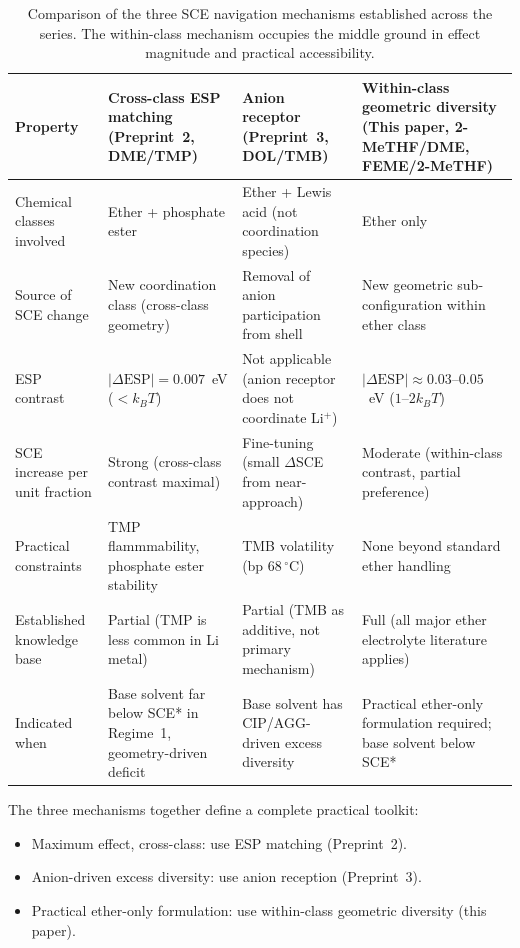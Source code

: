 \documentclass[11pt]{article}
\theoremstyle{plain}
\theoremstyle{definition}
\theoremstyle{remark}
\begin{document}
\begin{table}[h!]
\centering
\caption{Comparison of the three SCE navigation mechanisms established
across the series.  The within-class mechanism occupies the middle
ground in effect magnitude and practical accessibility.}
\label{tab:mechanism_comparison}
\small
\begin{tabular}{p{2.8cm}p{3.3cm}p{3.3cm}p{3.3cm}}
\toprule
Property & Cross-class ESP matching
  (Preprint~2, DME/TMP)
  & Anion receptor
  (Preprint~3, DOL/TMB)
  & Within-class geometric diversity
  (This paper, 2-MeTHF/DME, FEME/2-MeTHF) \\
\midrule
Chemical classes involved &
  Ether + phosphate ester &
  Ether + Lewis acid (not coordination species) &
  Ether only \\[4pt]
Source of SCE change &
  New coordination class (cross-class geometry) &
  Removal of anion participation from shell &
  New geometric sub-configuration within ether class \\[4pt]
ESP contrast &
  $|\Delta\mathrm{ESP}| = 0.007$~eV ($<k_BT$) &
  Not applicable (anion receptor does not coordinate Li$^+$) &
  $|\Delta\mathrm{ESP}| \approx 0.03$--$0.05$~eV ($1$--$2k_BT$) \\[4pt]
SCE increase per unit fraction &
  Strong (cross-class contrast maximal) &
  Fine-tuning (small $\Delta$SCE from near-approach) &
  Moderate (within-class contrast, partial preference) \\[4pt]
Practical constraints &
  TMP flammmability, phosphate ester stability &
  TMB volatility (bp $68\,^\circ$C) &
  None beyond standard ether handling \\[4pt]
Established knowledge base &
  Partial (TMP is less common in Li metal) &
  Partial (TMB as additive, not primary mechanism) &
  Full (all major ether electrolyte literature applies) \\[4pt]
Indicated when &
  Base solvent far below SCE* in Regime~1, geometry-driven deficit &
  Base solvent has CIP/AGG-driven excess diversity &
  Practical ether-only formulation required; base solvent below SCE* \\
\bottomrule
\end{tabular}
\end{table}

The three mechanisms together define a complete practical toolkit:
\begin{itemize}[leftmargin=2em]
  \item Maximum effect, cross-class: use ESP matching (Preprint~2).
  \item Anion-driven excess diversity: use anion reception
        (Preprint~3).
  \item Practical ether-only formulation: use within-class geometric
        diversity (this paper).
\end{itemize}
\end{document}
